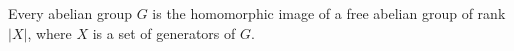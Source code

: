 Every abelian group $G$ is the homomorphic image of a free abelian group of rank $|X|$, where $X$ is a set of generators of $G$.
